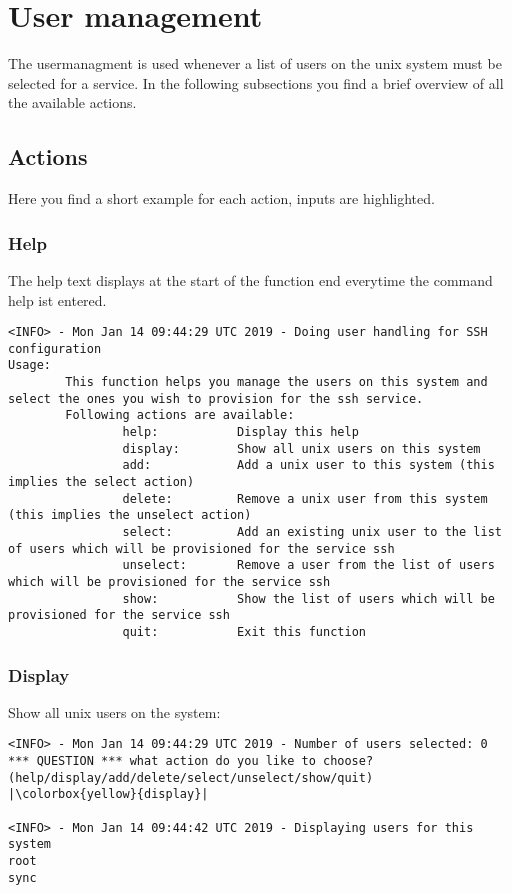 \section{User management} \label{user_management}
 The usermanagment is used whenever a list of users on the unix system must be selected for a service.
 In the following subsections you find a brief overview of all the available actions.

 \subsection{Actions}
 Here you find a short example for each action, inputs are highlighted.

 \subsubsection{Help}
 The help text displays at the start of the function end everytime the command help ist entered.
 \begin{lstlisting}[escapeinside=||]    
<INFO> - Mon Jan 14 09:44:29 UTC 2019 - Doing user handling for SSH configuration
Usage:
        This function helps you manage the users on this system and select the ones you wish to provision for the ssh service.
        Following actions are available:
                help:           Display this help
                display:        Show all unix users on this system
                add:            Add a unix user to this system (this implies the select action)
                delete:         Remove a unix user from this system (this implies the unselect action)
                select:         Add an existing unix user to the list of users which will be provisioned for the service ssh
                unselect:       Remove a user from the list of users which will be provisioned for the service ssh
                show:           Show the list of users which will be provisioned for the service ssh
                quit:           Exit this function
 \end{lstlisting}
 
 \subsubsection{Display}
 Show all unix users on the system:
 \begin{lstlisting}[escapeinside=||]    
<INFO> - Mon Jan 14 09:44:29 UTC 2019 - Number of users selected: 0                                                        
*** QUESTION *** what action do you like to choose? (help/display/add/delete/select/unselect/show/quit)  |\colorbox{yellow}{display}|
                                                                                                                                                                                                                                                                                                                                              
<INFO> - Mon Jan 14 09:44:42 UTC 2019 - Displaying users for this system
root
sync
 \end{lstlisting}
 
